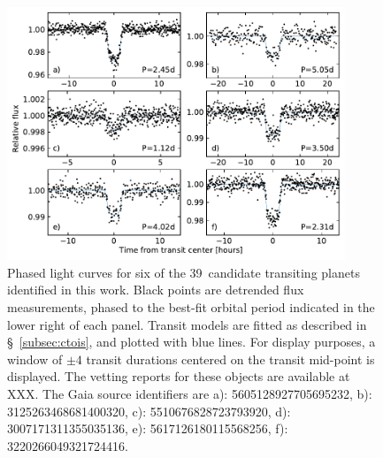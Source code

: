 \documentclass[12pt,twocolumn,tighten]{aastex62}
\newcommand{\numberpcs}{39\ }  %
\begin{document}
\begin{figure}[!t]
	\begin{center}
		\leavevmode
		\includegraphics[width=0.9\textwidth]{quilt_PCs.pdf}
	\end{center}
	\vspace{-0.2cm}
	\caption{
		Phased light curves for six of the \numberpcs candidate
			transiting planets identified in this work.
		Black points are detrended flux measurements, phased to the
		best-fit orbital period indicated in the lower right of each
		panel.
    Transit models are fitted as described in \S~\ref{subsec:ctois},
    and plotted with blue lines.
		For display purposes, a window of $\pm 4$ transit durations
		centered on the transit mid-point is displayed.
		The vetting reports for these objects are available at XXX.	%
		The Gaia source identifiers are
		a): 5605128927705695232, 
		b): 3125263468681400320, 
		c): 5510676828723793920, 
		d): 3007171311355035136, 
		e): 5617126180115568256, 
		f): 3220266049321724416.   
		\label{fig:ctoi_quilt}
	}
\end{figure}
\end{document}
